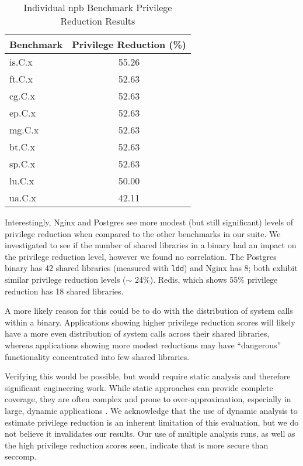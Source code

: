 \begin{table}[ht]
  \centering
  \caption{Individual \ac{npb} Benchmark Privilege Reduction Results}
  \label{tab:npb_individual_sorted}
  \begin{tabular}{l S[table-format=2.2]}
    \toprule
    Benchmark & {Privilege Reduction (\%)} \\ %
    \midrule
    is.C.x    & 55.26 \\ 
    ft.C.x    & 52.63 \\
    cg.C.x    & 52.63 \\
    ep.C.x    & 52.63 \\
    mg.C.x    & 52.63 \\
    bt.C.x    & 52.63 \\
    sp.C.x    & 52.63 \\
    lu.C.x    & 50.00 \\
    ua.C.x    & 42.11 \\ 
    \bottomrule
  \end{tabular}
\end{table}

Interestingly, Nginx and Postgres see more modest (but still significant) levels
of privilege reduction when compared to the other benchmarks in our suite. We
investigated to see if the number of shared libraries in a binary had an impact
on the privilege reduction level, however we found no correlation. The Postgres
binary has 42 shared libraries (measured with \texttt{ldd}) and Nginx has 8; 
both exhibit similar privilege reduction levels ($\sim$ 24\%). Redis, which
shows 55\% privilege reduction has 18 shared libraries. 

A more likely reason for this could be to do with the distribution of system
calls within a binary. Applications showing higher privilege reduction scores
will likely have a more even distribution of system calls across their shared
libraries, whereas applications showing more modest reductions may have
``dangerous'' functionality concentrated into few shared libraries.

Verifying this would be possible, but would require static analysis and
therefore significant engineering work. While static approaches can provide
complete coverage, they are often complex and prone to over-approximation, 
especially in large, dynamic applications \cite{ernst2007daikon}. We
acknowledge that the use of dynamic analysis to estimate privilege reduction
is an inherent limitation of this evaluation, but we do not believe it
invalidates our results. Our use of multiple analysis runs, as well as the
high privilege reduction scores seen, indicate that \af is more secure than
seccomp. 

